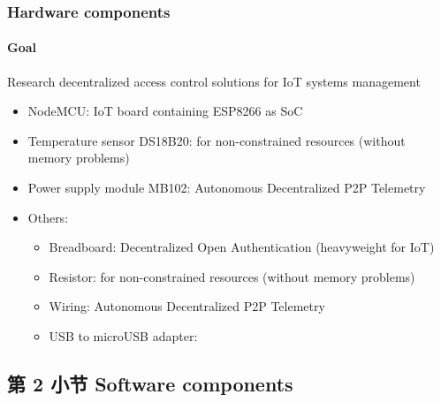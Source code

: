 \documentclass[
    aspectratio=169,                   %
]{beamer}
\begin{document}
    \begin{frame}
        \frametitle{Hardware components}

        \paragraph{Goal} Research decentralized access control solutions for IoT systems management

        \begin{itemize}
            \item \alert{NodeMCU}: IoT board containing ESP8266 as SoC
            \item \alert{Temperature sensor DS18B20}: for non-constrained resources (without memory problems)\cite{ouaddah}
            \item \alert{Power supply module MB102}: Autonomous Decentralized P2P Telemetry
            \item \alert{Others:}
            \begin{itemize}
                \item \alert{Breadboard}: Decentralized Open Authentication (heavyweight for IoT)
                \item \alert{Resistor}: for non-constrained resources (without memory problems)
                \item \alert{Wiring}: Autonomous Decentralized P2P Telemetry   
                \item \alert{USB to microUSB adapter}:      
            \end{itemize}
        \end{itemize}

    \end{frame}

\subsection{第 2 小节 Software components}
\end{document}
